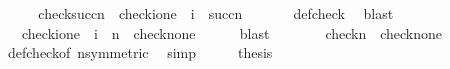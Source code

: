 \begin{isabellebody}
%
\isadelimproof
%
\endisadelimproof
%
\isatagproof
{}\isamarkupfalse%
\ {\isacharminus}{\kern0pt}\isanewline
\ \ \isamarkupfalse%
\ {\isachardoublequoteopen}check{\isacharparenleft}{\kern0pt}succ{\isacharparenleft}{\kern0pt}n{\isacharparenright}{\kern0pt}{\isacharparenright}{\kern0pt}\ {\isacharequal}{\kern0pt}\ {\isacharbraceleft}{\kern0pt}{\isasymlangle}check{\isacharparenleft}{\kern0pt}i{\isacharparenright}{\kern0pt}{\isacharcomma}{\kern0pt}one{\isasymrangle}\ {\isachardot}{\kern0pt}\ i\ {\isasymin}\ succ{\isacharparenleft}{\kern0pt}n{\isacharparenright}{\kern0pt}{\isacharbraceright}{\kern0pt}\ {\isachardoublequoteclose}\isanewline
\ \ \ \ \isamarkupfalse%
\ def{\isacharunderscore}{\kern0pt}check\ \isamarkupfalse%
\ blast\isanewline
\ \ \isamarkupfalse%
\ \isamarkupfalse%
\ {\isachardoublequoteopen}{\isachardot}{\kern0pt}{\isachardot}{\kern0pt}{\isachardot}{\kern0pt}\ {\isacharequal}{\kern0pt}\ {\isacharbraceleft}{\kern0pt}{\isasymlangle}check{\isacharparenleft}{\kern0pt}i{\isacharparenright}{\kern0pt}{\isacharcomma}{\kern0pt}one{\isasymrangle}\ {\isachardot}{\kern0pt}\ i\ {\isasymin}\ n{\isacharbraceright}{\kern0pt}\ {\isasymunion}\ {\isacharbraceleft}{\kern0pt}{\isasymlangle}check{\isacharparenleft}{\kern0pt}n{\isacharparenright}{\kern0pt}{\isacharcomma}{\kern0pt}one{\isasymrangle}{\isacharbraceright}{\kern0pt}{\isachardoublequoteclose}\isanewline
\ \ \ \ \isamarkupfalse%
\ blast\isanewline
\ \ \isamarkupfalse%
\ \isamarkupfalse%
\ {\isachardoublequoteopen}{\isachardot}{\kern0pt}{\isachardot}{\kern0pt}{\isachardot}{\kern0pt}\ {\isacharequal}{\kern0pt}\ check{\isacharparenleft}{\kern0pt}n{\isacharparenright}{\kern0pt}\ {\isasymunion}\ {\isacharbraceleft}{\kern0pt}{\isasymlangle}check{\isacharparenleft}{\kern0pt}n{\isacharparenright}{\kern0pt}{\isacharcomma}{\kern0pt}one{\isasymrangle}{\isacharbraceright}{\kern0pt}{\isachardoublequoteclose}\isanewline
\ \ \ \ \isamarkupfalse%
\ def{\isacharunderscore}{\kern0pt}check{\isacharbrackleft}{\kern0pt}of\ n{\isacharcomma}{\kern0pt}symmetric{\isacharbrackright}{\kern0pt}\ \isamarkupfalse%
\ simp\isanewline
\ \ \isamarkupfalse%
\ \isamarkupfalse%
\ {\isacharquery}{\kern0pt}thesis\ \isacommand{{\isachardot}{\kern0pt}}\isamarkupfalse%
\isanewline
{}\isamarkupfalse%
%
\endisatagproof
{\isafoldproof}%
%
\isadelimproof
\isanewline
%
\endisadelimproof
\isanewline
{}\isamarkupfalse%

\end{isabellebody}
